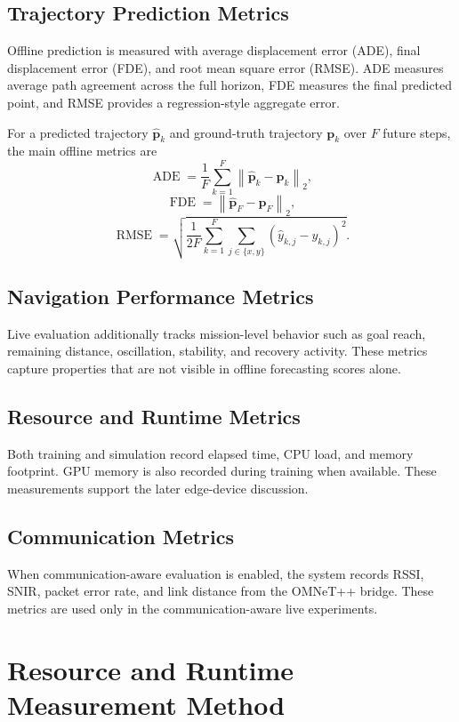 \subsection{Trajectory Prediction Metrics}

Offline prediction is measured with average displacement error (ADE), final displacement error (FDE), and root mean square error (RMSE). ADE measures average path agreement across the full horizon, FDE measures the final predicted point, and RMSE provides a regression-style aggregate error.

For a predicted trajectory $\hat{\mathbf{p}}_k$ and ground-truth trajectory $\mathbf{p}_k$ over $F$ future steps, the main offline metrics are
\[
\operatorname{ADE} =
\frac{1}{F}\sum_{k=1}^{F}
\left\lVert \hat{\mathbf{p}}_k - \mathbf{p}_k \right\rVert_2,
\]
\[
\operatorname{FDE} =
\left\lVert \hat{\mathbf{p}}_F - \mathbf{p}_F \right\rVert_2,
\]
\[
\operatorname{RMSE} =
\sqrt{
\frac{1}{2F}
\sum_{k=1}^{F}
\sum_{j \in \{x,y\}}
\left(\hat{y}_{k,j} - y_{k,j}\right)^2 }.
\]

\subsection{Navigation Performance Metrics}

Live evaluation additionally tracks mission-level behavior such as goal reach, remaining distance, oscillation, stability, and recovery activity. These metrics capture properties that are not visible in offline forecasting scores alone.

\subsection{Resource and Runtime Metrics}

Both training and simulation record elapsed time, CPU load, and memory footprint. GPU memory is also recorded during training when available. These measurements support the later edge-device discussion.

\subsection{Communication Metrics}

When communication-aware evaluation is enabled, the system records RSSI, SNIR, packet error rate, and link distance from the OMNeT++ bridge. These metrics are used only in the communication-aware live experiments.

\section{Resource and Runtime Measurement Method}

